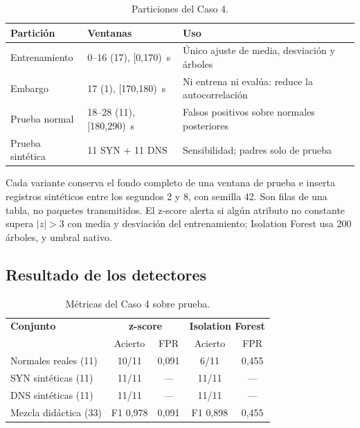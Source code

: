 \begin{table}[H]\centering\small\caption{Particiones del Caso 4.}
\begin{tabularx}{\linewidth}{@{}llX@{}}\toprule
\textbf{Partición} & \textbf{Ventanas} & \textbf{Uso}\\\midrule
Entrenamiento & 0–16 (17), [0,170)~s & Único ajuste de media, desviación y árboles\\
Embargo & 17 (1), [170,180)~s & Ni entrena ni evalúa: reduce la autocorrelación\\
Prueba normal & 18–28 (11), [180,290)~s & Falsos positivos sobre normales posteriores\\
Prueba sintética & 11 SYN + 11 DNS & Sensibilidad; padres solo de prueba\\
\bottomrule\end{tabularx}\end{table}

Cada variante conserva el fondo completo de una ventana de prueba e inserta registros sintéticos entre los segundos 2 y 8, con semilla 42. Son filas de una tabla, no paquetes transmitidos. El z-score alerta si algún atributo no constante supera $|z| > 3$ con media y desviación del entrenamiento; Isolation Forest usa 200 árboles,  y umbral nativo.

\subsection{Resultado de los detectores}

\begin{table}[H]\centering\small\caption{Métricas del Caso 4 sobre prueba.}
\begin{tabular}{@{}lcccc@{}}\toprule
\textbf{Conjunto} & \multicolumn{2}{c}{\textbf{z-score}} & \multicolumn{2}{c}{\textbf{Isolation Forest}}\\
 & Acierto & FPR & Acierto & FPR\\\midrule
Normales reales (11) & 10/11 & 0,091 & 6/11 & 0,455\\
SYN sintéticas (11) & 11/11 & — & 11/11 & —\\
DNS sintéticas (11) & 11/11 & — & 11/11 & —\\
Mezcla didáctica (33) & F1 0,978 & 0,091 & F1 0,898 & 0,455\\
\bottomrule\end{tabular}\end{table}

